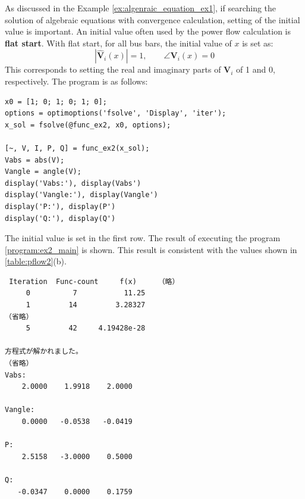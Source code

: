 \documentclass[tombow,dvipdfmx]{corona-a5-1.1}
\begin{document}
\begin{例}
As discussed in the Example \nobreak\ref{ex:algenraic_equation_ex1}, if searching the solution of algebraic equations with convergence calculation, setting of the initial value is important.
An initial value often used by the power flow calculation is \textbf{flat start}. With flat start, for all bus bars, the initial value of $x$ is set as:
\[
|\hat{\bm V}_i(x)|=1
,\qquad
\angle \bm V_i(x) = 0
\]
This corresponds to setting the real and imaginary parts of $\bm V_i$ of 1 and 0, respectively.
The program is as follows:

\smallskip
\begin{PROGRAMA}[count,title={main\_ex2.m}]\label{program:ex2_main}
\begin{verbatim}
x0 = [1; 0; 1; 0; 1; 0];
options = optimoptions('fsolve', 'Display', 'iter');
x_sol = fsolve(@func_ex2, x0, options);

[~, V, I, P, Q] = func_ex2(x_sol);
Vabs = abs(V);
Vangle = angle(V);
display('Vabs:'), display(Vabs')
display('Vangle:'), display(Vangle')
display('P:'), display(P')
display('Q:'), display(Q')
\end{verbatim}
\end{PROGRAMA}

The initial value is set in the first row. The result of executing the program \nobreak\ref{program:ex2_main} is shown.
This result is consistent with the values shown in \ref{table:pflow2}(b).

\smallskip
\begin{実行結果}
\begin{verbatim}
 Iteration  Func-count     f(x)     （略）
     0          7           11.25 
     1         14         3.28327 
（省略）
     5         42     4.19428e-28

方程式が解かれました。
（省略）
Vabs:
    2.0000    1.9918    2.0000

Vangle:
    0.0000   -0.0538   -0.0419

P:
    2.5158   -3.0000    0.5000

Q:
   -0.0347    0.0000    0.1759
\end{verbatim}
\end{実行結果}

\end{例}

\end{document}
